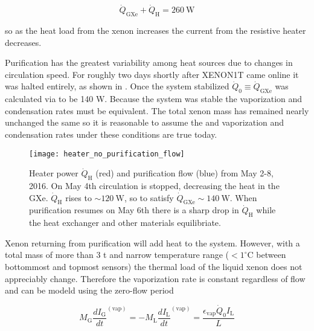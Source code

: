 \begin{equation}
\dot{Q}_{\mathrm{GXe}} + \dot{Q}_{\mathrm{H}} = 260\ \mathrm{W}
\label{eq:electron_lifetime_model_vap_and_cond_heat_gxe}
\end{equation}

\noindent so as the heat load from the xenon increases the current from the resistive heater decreases.

Purification has the greatest variability among heat sources due to changes in circulation speed.  For roughly two days shortly after
XENON1T came online it was halted entirely, as shown in .  Once the system
stabilized $\dot{Q}_0 \equiv \dot{Q}_{\mathrm{GXe}}$ was calculated via
 to be 140 W.  Because the system was stable the vaporization and condensation
rates must be equivalent.  The total xenon mass has remained nearly unchanged the same so it is reasonable to assume the \qdh and
vaporization and condensation rates under these conditions are true today.

\begin{figure}
\centering
\texttt{[image: heater\_no\_purification\_flow]}
\caption{Heater power $\dot{Q}_{\mathrm{H}}$ (red) and purification flow (blue) from May 2-8, 2016.  On May 4th circulation is stopped,
decreasing the heat in the GXe.  $\dot{Q}_{\mathrm{H}}$ rises to ${\sim}120\ \mathrm{W}$, so to satisfy
 $\dot{Q}_{\mathrm{GXe}} \sim 140\ \mathrm{W}$.  When purification resumes on
May 6th there is a sharp drop in $\dot{Q}_{\mathrm{H}}$ while the heat exchanger and other materials equilibriate.}
\label{fig:electron_lifetime_model_vap_and_cond_no_flow}
\end{figure}

Xenon returning from purification will add heat to the system.  However, with a total mass of more than 3 t and
narrow temperature range ($< 1^{\circ}\mathrm{C}$ between bottommost and topmost sensors) the thermal load of the liquid xenon does not
appreciably change.  Therefore the vaporization rate is constant regardless of flow and can be modeld using the zero-flow period

\begin{equation}
M_{\mathrm{G}} \frac{dI_{\mathrm{G}}}{dt}^{(\mathrm{vap})} = -M_{\mathrm{L}} \frac{dI_{\mathrm{L}}}{dt}^{(\mathrm{vap})} =
\frac{\epsilon_{\mathrm{vap}} \dot{Q}_0 I_{\mathrm{L}}}{L}
\end{equation}

